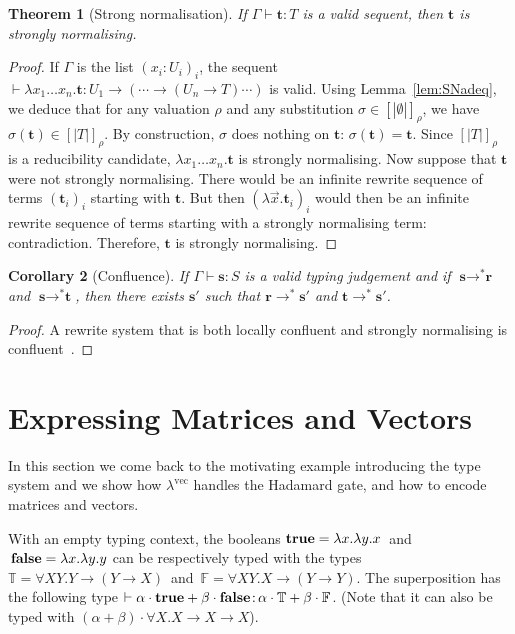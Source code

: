 \documentclass[colorlinks=true,linkcolor=black,urlcolor=black,citecolor=blue,submission,copyright,creativecommons]{eptcs}
\newtheorem{theorem}{Theorem}[section]
\newtheorem{corollary}[theorem]{Corollary}
\newcommand{\lvec}{\ensuremath{\lambda^{\!\!\textrm{vec}}}}
\newcommand{\True}{\mathbb{T}}
\newcommand{\False}{\mathbb{F}}
\newcommand{\true}{{\bf true}}
\newcommand{\false}{{\bf false}}
\newcommand{\ve}[1]{\mathrm{\textbf{#1}}}
\newcommand{\type}{\colon\!}
\newcommand{\denot}[1]{{[\!|{#1}|\!]}}
\begin{document}
\begin{theorem}[Strong normalisation]\label{th:SN}
  If $\Gamma\vdash\ve t:T$ is a valid sequent, then $\ve t$ is strongly normalising.
\end{theorem}
\begin{proof}
  If $\Gamma$ is the list $(x_i:U_i)_i$, the sequent $\vdash\lambda x_1\ldots x_n.\ve t:U_1\to(\cdots\to(U_n\to T)\cdots)$ is valid. Using Lemma~\ref{lem:SNadeq}, we deduce that for any valuation $\rho$ and any substitution $\sigma\in\denot{\emptyset}_\rho$, we have $\sigma(\ve t)\in\denot{T}_\rho$. By construction, $\sigma$ does nothing on $\ve t$: $\sigma(\ve t) = \ve t$. Since $\denot{T}_\rho$ is a reducibility candidate, $\lambda x_1\ldots x_n.\ve t$ is strongly normalising. Now suppose that $\ve t$ were not strongly normalising. There would be an infinite rewrite sequence of terms  $(\ve t_i)_i$ starting with $\ve t$. But then $(\lambda\vec{x}.\ve t_i)_i$ would then be an infinite rewrite sequence of terms starting with a strongly normalising term: contradiction. Therefore, $\ve t$ is strongly normalising.
\end{proof}

 
  
\begin{corollary}[Confluence]
  If $\Gamma\vdash\ve{s}\type S$ is a valid typing judgement and if
  $\ve{s}\to^*\ve{r}$ and $\ve{s}\to^*\ve{t}$, then there exists $\ve{s}'$
  such that $\ve{r}\to^*\ve{s}'$ and $\ve{t}\to^*\ve{s}'$.
\end{corollary}
\begin{proof}
  A rewrite system that is both locally confluent and strongly
  normalising is confluent~\cite{terese03}.
\end{proof}

\section{Expressing Matrices and Vectors}\label{sec:examples}

In this section we come back to the motivating example introducing the
type system and we show how {\lvec} handles the Hadamard gate, and how
to encode matrices and vectors.

With an empty typing context, the booleans 
$\true=\lambda x.\lambda y.x\,$ and $\,\false=\lambda x.\lambda y.y$
can be respectively typed with the types 
$\True=\forall XY.Y\to (Y\to X)\,$ and $\,\False=\forall XY.X\to (Y\to Y)$.
The superposition has the following type $\vdash\alpha\cdot\true+\beta\cdot\false\type\alpha\cdot\True + \beta\cdot\False$. (Note that it can also be typed with $(\alpha+\beta)\cdot \forall X.X\to X\to X$).
\end{document}
